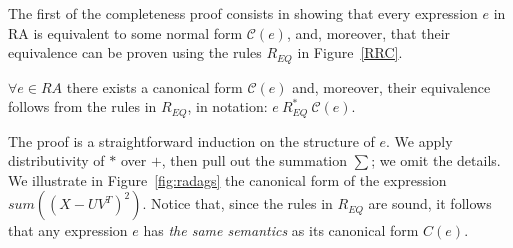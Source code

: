 The first of the completeness proof consists in showing that every
expression $e$ in RA is equivalent to some normal form
$\mathcal{C}(e)$, and, moreover, that their equivalence can be proven
using the rules $R_{EQ}$ in Figure~\ref{RRC}.

\begin{lemma}\label{lCanonPreservesSemantics}
$\forall e \in RA$ there exists a canonical form $\mathcal{C}(e)$ and,
moreover, their equivalence follows from the rules in $R_{EQ}$, in
notation: $e\ R_{EQ}^*\  \mathcal{C}(e)$.
\end{lemma}

The proof is a straightforward induction on the structure of $e$.  We
apply distributivity of $*$ over $+$, then pull out the summation
$\sum$; we omit the details.  We illustrate in Figure~\ref{fig:radags}
the canonical form of the expression $sum((X-UV^T)^2)$.  Notice that,
since the rules in $R_{EQ}$ are sound, it follows that any expression
$e$ has {\em the same semantics} as its canonical form
$\mathit{C}(e)$.

% 



